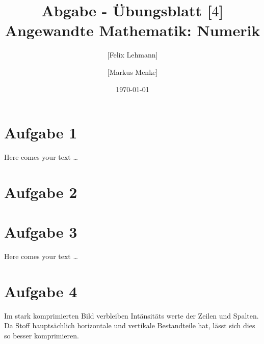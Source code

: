 \documentclass[10pt,a4paper]{article}
\begin{document}
\title{Abgabe - Übungsblatt [$4$]\\
\small{Angewandte Mathematik: Numerik}}
\author{ [Felix Lehmann] \and [Markus Menke]}
\date{\today}
\maketitle

\section*{Aufgabe 1}
Here comes your text \ldots

\section*{Aufgabe 2}


\section*{Aufgabe 3}
Here comes your text \ldots

\section*{Aufgabe 4}

Im stark komprimierten Bild verbleiben Intänsitäts werte der Zeilen und Spalten.
Da \glqq Stoff\grqq{} hauptsächlich horizontale und vertikale Bestandteile hat, lässt sich dies so besser komprimieren.
\end{document}
